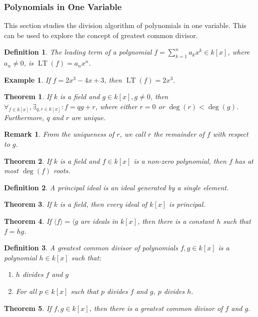 \documentclass{article}
\theoremstyle{mystyle}
\newtheorem{theorem}{Theorem}[section]
\newtheorem{definition}{Definition}[section]
\newtheorem{example}{Example}[section]
\newtheorem{remark}{Remark}[section]
\DeclareMathOperator{\LT}{LT}
\begin{document}
\subsubsection{Polynomials in One Variable}
This section studies the division algorithm of polynomials in one variable. This can be used to explore the concept of greatest common divisor.
\begin{definition}
The leading term of a polynomial $f = \sum_{k=1}^{n} a_kx^k \in k[x]$, where $a_n \ne 0$, is $\LT(f)=a_nx^n$.
\end{definition}
\begin{example}
If $f = 2x^3-4x+3$, then $\LT(f) = 2x^3$.
\end{example}
\begin{theorem}
If $k$ is a field and $g\in k[x],g\ne 0$, then $\forall_{f\in k[x]}, \exists_{q,r\in k[x]}: f = qg+r$, where either $r=0$ or $\deg(r)<\deg(g)$. Furthermore, $q$ and $r$ are unique.
\end{theorem}
\begin{remark}
From the uniqueness of $r$, we call $r$ the remainder of $f$ with respect to $g$.
\end{remark}
\begin{theorem}
If $k$ is a field and $f\in k[x]$ is a non-zero polynomial, then $f$ has at most $\deg(f)$ roots.
\end{theorem}
\begin{definition}
A principal ideal is an ideal generated by a single element.
\end{definition}
\begin{theorem}
If $k$ is a field, then every ideal of $k[x]$ is principal.
\end{theorem}
\begin{theorem}
If $\langle f \rangle = \langle g$ are ideals in $k[x]$, then there is a constant $h$ such that $f=hg$.
\end{theorem}
\begin{definition}
A greatest common divisor of polynomials $f,g\in k[x]$ is a polynomial $h\in k[x]$ such that:
\begin{enumerate}
    \item $h$ divides $f$ and $g$
    \item For all $p\in k[x]$ such that $p$ divides $f$ and $g$, $p$ divides $h$.
\end{enumerate}
\end{definition}
\begin{theorem}
If $f,g\in k[x]$, then there is a greatest common divisor of $f$ and $g$.
\end{theorem}
\end{document}
